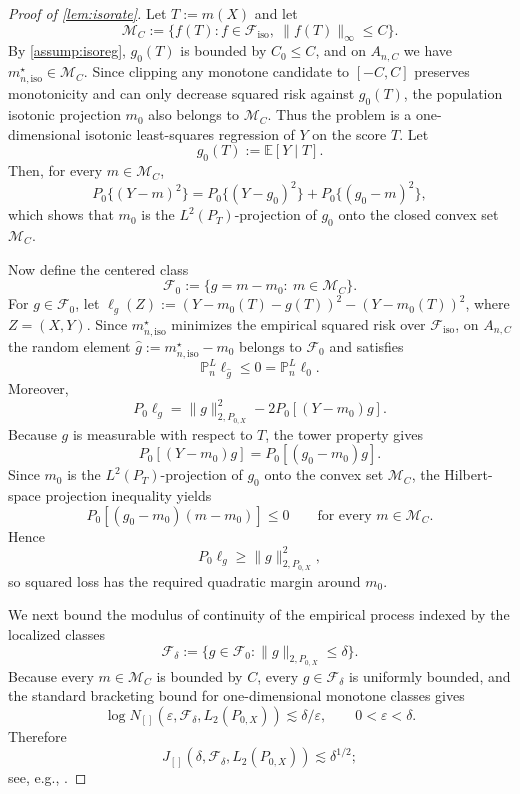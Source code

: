 \documentclass{article}
\theoremstyle{plain}
\theoremstyle{definition}
\newcommand{\E}{\mathbb{E}}
\newcommand{\1}{\mathbbm{1}}
\newcommand{\mhat}{m}
\newcommand{\Pl}{\mathbb{P}^{L}_n}
\newcommand{\Px}{P_{0,X}}
\begin{document}
\begin{proof}[Proof of \cref{lem:isorate}]
 


Let \(T:=\mhat(X)\) and let
\[
\mathcal M_C:=\{f(T):f\in\mathcal F_{\mathrm{iso}},\ \|f(T)\|_\infty\le C\}.
\]
By \cref{assump:isoreg}, \(g_0(T)\) is bounded by \(C_0\le C\), and on \(A_{n,C}\) we have \(m_{n,\mathrm{iso}}^\star\in\mathcal M_C\). Since clipping any monotone candidate to \([-C,C]\) preserves monotonicity and can only decrease squared risk against \(g_0(T)\), the population isotonic projection \(m_0\) also belongs to \(\mathcal M_C\). Thus the problem is a one-dimensional isotonic least-squares regression of \(Y\) on the score \(T\). Let
\[
g_0(T):=\E[Y\mid T].
\]
Then, for every \(m\in\mathcal M_C\),
\[
P_0\{(Y-m)^2\}
=
P_0\{(Y-g_0)^2\}+P_0\{(g_0-m)^2\},
\]
which shows that \(m_0\) is the \(L^2(P_T)\)-projection of \(g_0\) onto the closed convex set \(\mathcal M_C\).

Now define the centered class
\[
\mathcal F_0:=\{g=m-m_0:\ m\in\mathcal M_C\}.
\]
For \(g\in\mathcal F_0\), let \(\ell_g(Z):=(Y-m_0(T)-g(T))^2-(Y-m_0(T))^2\), where \(Z=(X,Y)\). Since \(m_{n,\mathrm{iso}}^\star\) minimizes the empirical squared risk over \(\mathcal F_{\mathrm{iso}}\), on \(A_{n,C}\) the random element \(\hat g:=m_{n,\mathrm{iso}}^\star-m_0\) belongs to \(\mathcal F_0\) and satisfies
\[
\Pl \ell_{\hat g}\le 0=\Pl \ell_0.
\]
Moreover,
\[
P_0 \ell_g
=
\|g\|_{2,\Px}^2-2P_0\left[(Y-m_0)g\right].
\]
Because \(g\) is measurable with respect to \(T\), the tower property gives
\[
P_0\left[(Y-m_0)g\right]
=
P_0\left[(g_0-m_0)g\right].
\]
Since \(m_0\) is the \(L^2(P_T)\)-projection of \(g_0\) onto the convex set \(\mathcal M_C\), the Hilbert-space projection inequality yields
\[
P_0\left[(g_0-m_0)(m-m_0)\right]\le 0
\qquad\text{for every }m\in\mathcal M_C.
\]
Hence
\[
P_0 \ell_g \ge \|g\|_{2,\Px}^2,
\]
so squared loss has the required quadratic margin around \(m_0\).

We next bound the modulus of continuity of the empirical process indexed by the localized classes
\[
\mathcal F_\delta:=\{g\in\mathcal F_0:\|g\|_{2,\Px}\le \delta\}.
\]
Because every \(m\in\mathcal M_C\) is bounded by \(C\), every \(g\in\mathcal F_\delta\) is uniformly bounded, and the standard bracketing bound for one-dimensional monotone classes gives
\[
\log N_{[]}(\varepsilon,\mathcal F_\delta,L_2(\Px))
\lesssim
\delta/\varepsilon,
\qquad 0<\varepsilon<\delta.
\]
Therefore
\[
J_{[]}(\delta,\mathcal F_\delta,L_2(\Px))\lesssim \delta^{1/2};
\]
see, e.g., \citet{vdvwellner1996}.


\end{proof}
\end{document}
